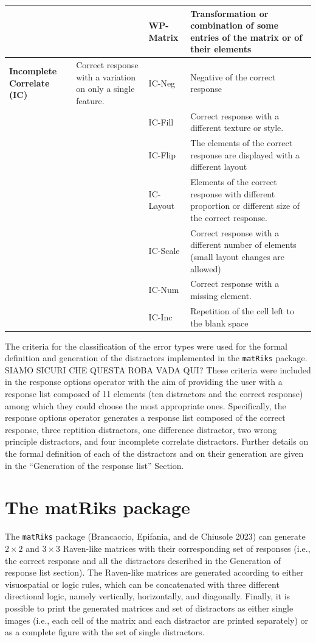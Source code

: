 \begin{table}
\begin{tabular}[t]{>{}l|l|l|l}
\textbf{} &  & WP-Matrix & Transformation or combination of some entries of the matrix or of their elements\\
\hline
\textbf{Incomplete Correlate (IC)} & Correct response with a variation on only a single feature. & IC-Neg & Negative of the correct response\\
\hline
\textbf{} &  & IC-Fill & Correct response with a different texture or style.\\
\hline
\textbf{} &  & IC-Flip & The elements of the correct response are displayed with a different layout\\
\hline
\textbf{} &  & IC-Layout & Elements of the correct response with different proportion or different size of the correct response.\\
\hline
\textbf{} &  & IC-Scale & Correct response with a different number of elements (small layout changes are allowed)\\
\hline
\textbf{} &  & IC-Num & Correct response with a missing element.\\
\hline
\textbf{} &  & IC-Inc & Repetition of the cell left to the blank space\\
\hline
\end{tabular}
\end{table}

The criteria for the classification of the error types were used for the formal definition and generation of the distractors implemented in the \texttt{matRiks} package.
SIAMO SICURI CHE QUESTA ROBA VADA QUI?
These criteria were included in the response options operator with the aim of providing the user with a response list composed of 11 elements (ten distractors and the correct response) among which they could choose the most appropriate ones. Specifically, the response options operator generates a response list composed of the correct response, three reptition distractors, one difference distractor, two wrong principle distractors, and four incomplete correlate distractors.
Further details on the formal definition of each of the distractors and on their generation are given in the ``Generation of the response list'' Section.

\section{The matRiks package}\label{the-matriks-package}

The \texttt{matRiks} package (Brancaccio, Epifania, and de Chiusole 2023) can generate \(2 \times 2\) and \(3 \times 3\) Raven-like matrices with their corresponding set of responses (i.e., the correct response and all the distractors described in the Generation of response list section). The Raven-like matrices are generated according to either visuospatial or logic rules, which can be concatenated with three different directional logic, namely vertically, horizontally, and diagonally.
Finally, it is possible to print the generated matrices and set of distractors as either single images (i.e., each cell of the matrix and each distractor are printed separately) or as a complete figure with the set of single distractors.

